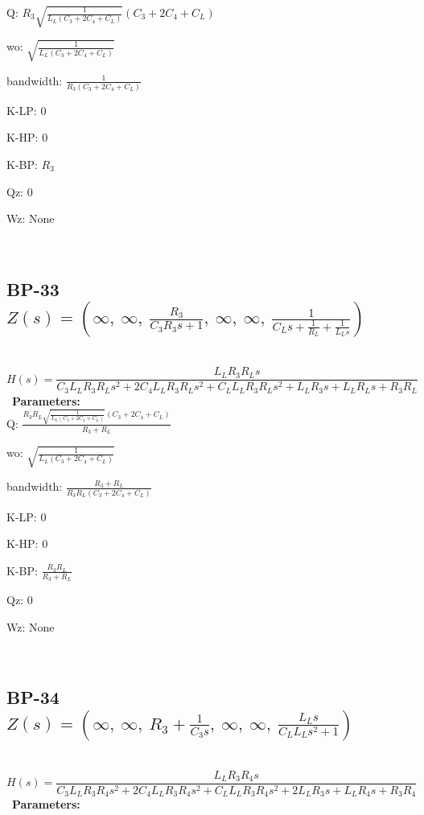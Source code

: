 \documentclass{article}
\begin{document}
Q: $R_{3} \sqrt{\frac{1}{L_{L} \left(C_{3} + 2 C_{4} + C_{L}\right)}} \left(C_{3} + 2 C_{4} + C_{L}\right)$\ 

wo: $\sqrt{\frac{1}{L_{L} \left(C_{3} + 2 C_{4} + C_{L}\right)}}$\ 

bandwidth: $\frac{1}{R_{3} \left(C_{3} + 2 C_{4} + C_{L}\right)}$\ 

K-LP: $0$\ 

K-HP: $0$\ 

K-BP: $R_{3}$\ 

Qz: $0$\ 

Wz: $\text{None}$\ 

\ 

\subsection{BP-33 $Z(s) = \left( \infty, \  \infty, \  \frac{R_{3}}{C_{3} R_{3} s + 1}, \  \infty, \  \infty, \  \frac{1}{C_{L} s + \frac{1}{R_{L}} + \frac{1}{L_{L} s}}\right)$ } \ 
\textbf{\[H(s) = \frac{L_{L} R_{3} R_{L} s}{C_{3} L_{L} R_{3} R_{L} s^{2} + 2 C_{4} L_{L} R_{3} R_{L} s^{2} + C_{L} L_{L} R_{3} R_{L} s^{2} + L_{L} R_{3} s + L_{L} R_{L} s + R_{3} R_{L}}\] } \ 
\textbf{Parameters:}\\ 

Q: $\frac{R_{3} R_{L} \sqrt{\frac{1}{L_{L} \left(C_{3} + 2 C_{4} + C_{L}\right)}} \left(C_{3} + 2 C_{4} + C_{L}\right)}{R_{3} + R_{L}}$\ 

wo: $\sqrt{\frac{1}{L_{L} \left(C_{3} + 2 C_{4} + C_{L}\right)}}$\ 

bandwidth: $\frac{R_{3} + R_{L}}{R_{3} R_{L} \left(C_{3} + 2 C_{4} + C_{L}\right)}$\ 

K-LP: $0$\ 

K-HP: $0$\ 

K-BP: $\frac{R_{3} R_{L}}{R_{3} + R_{L}}$\ 

Qz: $0$\ 

Wz: $\text{None}$\ 

\ 

\subsection{BP-34 $Z(s) = \left( \infty, \  \infty, \  R_{3} + \frac{1}{C_{3} s}, \  \infty, \  \infty, \  \frac{L_{L} s}{C_{L} L_{L} s^{2} + 1}\right)$ } \ 
\textbf{\[H(s) = \frac{L_{L} R_{3} R_{4} s}{C_{3} L_{L} R_{3} R_{4} s^{2} + 2 C_{4} L_{L} R_{3} R_{4} s^{2} + C_{L} L_{L} R_{3} R_{4} s^{2} + 2 L_{L} R_{3} s + L_{L} R_{4} s + R_{3} R_{4}}\] } \ 
\textbf{Parameters:}\\ 
\end{document}
